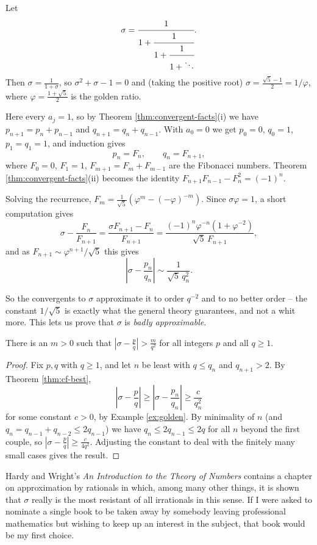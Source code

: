 \begin{example}\label{ex:golden}
	Let
	$$\sigma = \cfrac1{1+\cfrac1{1+\cfrac1{1+\ddots}}}.$$
	Then $\sigma = \frac{1}{1+\sigma}$, so $\sigma^2+\sigma-1 = 0$ and (taking the positive root) $\sigma = \frac{\sqrt5-1}{2} = 1/\varphi$, where $\varphi = \frac{1+\sqrt5}{2}$ is the golden ratio.

	Here every $a_j = 1$, so by Theorem \ref{thm:convergent-facts}(i) we have $p_{n+1}=p_n+p_{n-1}$ and $q_{n+1}=q_n+q_{n-1}$. With $a_0=0$ we get $p_0 = 0$, $q_0 = 1$, $p_1 = q_1 = 1$, and induction gives
	$$p_n = F_n, \qquad q_n = F_{n+1},$$
	where $F_0=0$, $F_1 = 1$, $F_{m+1}=F_m+F_{m-1}$ are the Fibonacci numbers. Theorem \ref{thm:convergent-facts}(ii) becomes the identity $F_{n+1}F_{n-1}-F_n^2 = (-1)^n$.

	Solving the recurrence, $F_m = \frac{1}{\sqrt5}\left(\varphi^m - (-\varphi)^{-m}\right)$. Since $\sigma\varphi = 1$, a short computation gives
	$$\sigma - \frac{F_n}{F_{n+1}} = \frac{\sigma F_{n+1}-F_n}{F_{n+1}} = \frac{(-1)^n\varphi^{-n}(1+\varphi^{-2})}{\sqrt5\,F_{n+1}},$$
	and as $F_{n+1}\sim\varphi^{n+1}/\sqrt5$ this gives
	$$\left|\sigma-\frac{p_n}{q_n}\right|\sim\frac{1}{\sqrt5\,q_n^2}.$$
\end{example}

So the convergents to $\sigma$ approximate it to order $q^{-2}$ and to no better order -- the constant $1/\sqrt5$ is exactly what the general theory guarantees, and not a whit more. This lets us prove that $\sigma$ is \emph{badly approximable}.

\begin{proposition}
	There is an $m>0$ such that $\left|\sigma-\frac pq\right| > \frac{m}{q^2}$ for all integers $p$ and all $q\geq1$.
\end{proposition}

\begin{proof}
	Fix $p,q$ with $q\geq1$, and let $n$ be least with $q\leq q_n$ and $q_{n+1}>2$. By Theorem \ref{thm:cf-best},
	$$\left|\sigma-\frac pq\right|\geq\left|\sigma-\frac{p_n}{q_n}\right|\geq\frac{c}{q_n^2}$$
	for some constant $c>0$, by Example \ref{ex:golden}. By minimality of $n$ (and $q_{n} = q_{n-1}+q_{n-2}\leq 2q_{n-1}$) we have $q_n \leq 2q_{n-1}\leq 2q$ for all $n$ beyond the first couple, so $\left|\sigma-\frac pq\right|\geq \frac{c}{4q^2}$. Adjusting the constant to deal with the finitely many small cases gives the result.
\end{proof}

Hardy and Wright's \emph{An Introduction to the Theory of Numbers} contains a chapter on approximation by rationals in which, among many other things, it is shown that $\sigma$ really is the most resistant of all irrationals in this sense. If I were asked to nominate a single book to be taken away by somebody leaving professional mathematics but wishing to keep up an interest in the subject, that book would be my first choice.

